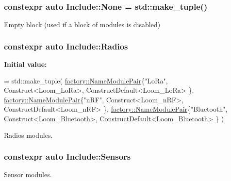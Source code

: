 \subsubsection[{\texorpdfstring{None}{None}}]{\setlength{\rightskip}{0pt plus 5cm}constexpr auto Include\+::\+None = std\+::make\+\_\+tuple()}\hypertarget{namespace_include_a223a3f93bed9db5706b58e6fd15c8810}{}\label{namespace_include_a223a3f93bed9db5706b58e6fd15c8810}


Empty block (used if a block of modules is disabled) 

\subsubsection[{\texorpdfstring{Radios}{Radios}}]{\setlength{\rightskip}{0pt plus 5cm}constexpr auto Include\+::\+Radios}\hypertarget{namespace_include_aaef3f142b15f5413c545a4b50a662fcc}{}\label{namespace_include_aaef3f142b15f5413c545a4b50a662fcc}
{\bfseries Initial value\+:}
\begin{DoxyCode}
= std::make\_tuple(
                \hyperlink{structfactory_1_1_name_module_pair}{factory::NameModulePair}\{\textcolor{stringliteral}{"LoRa"},          Construct<Loom\_LoRa>,           
      ConstructDefault<Loom\_LoRa> \},
                \hyperlink{structfactory_1_1_name_module_pair}{factory::NameModulePair}\{\textcolor{stringliteral}{"nRF"},           Construct<Loom\_nRF>,            
      ConstructDefault<Loom\_nRF> \},
                \hyperlink{structfactory_1_1_name_module_pair}{factory::NameModulePair}\{\textcolor{stringliteral}{"Bluetooth"}, Construct<Loom\_Bluetooth>,      
      ConstructDefault<Loom\_Bluetooth> \}
            )
\end{DoxyCode}


Radios modules. 

\subsubsection[{\texorpdfstring{Sensors}{Sensors}}]{\setlength{\rightskip}{0pt plus 5cm}constexpr auto Include\+::\+Sensors}\hypertarget{namespace_include_afdc5a0bd51655ca57718cdca40e5b277}{}\label{namespace_include_afdc5a0bd51655ca57718cdca40e5b277}


Sensor modules. 

